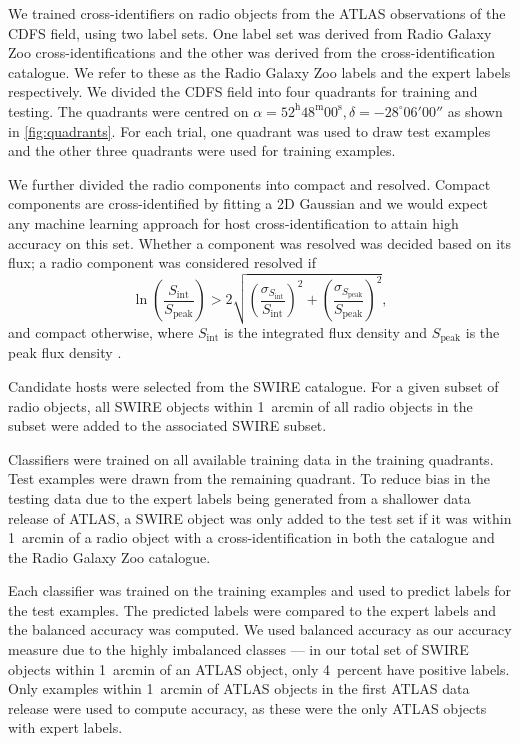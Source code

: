 \documentclass[fleqn,usenatbib,usedcolumn]{mnras}
\begin{document}
    We trained cross-identifiers on radio objects from the ATLAS observations of
    the CDFS field, using two label sets. One label set was derived from Radio
    Galaxy Zoo cross-identifications and the other was derived from the
    \citet{norris06} cross-identification catalogue. We refer to these as the
    Radio Galaxy Zoo labels and the expert labels respectively. We divided the
    CDFS field into four quadrants for training and testing. The quadrants were
    centred on $\alpha = 52^\text{h}48^\text{m}00^\text{s},
    \delta = -28^\circ{}06'00''$ as shown in \autoref{fig:quadrants}. For
    each trial, one quadrant was used to draw test examples and the other three
    quadrants were used for training examples.

    We further divided the radio components into compact and resolved. Compact
    components are cross-identified by fitting a 2D Gaussian \citep[as
    in][]{norris06} and we would expect any machine learning approach for host
    cross-identification to attain high accuracy on this set. Whether a
    component was resolved was decided based on its flux; a radio component was
    considered resolved if
    \begin{equation}
        \ln \left(
          \frac{S_{\text{int}}}
               {S_{\text{peak}}}
        \right) > 2\sqrt{\left(
          \frac{\sigma_{S_{\text{int}}}}
               {S_{\text{int}}}
        \right)^2 + \left(
          \frac{\sigma_{S_{\text{peak}}}}
               {S_{\text{peak}}}
        \right)^2},
    \end{equation}%
    and compact otherwise, where \(S_{\text{int}}\) is the integrated flux
    density and \(S_{\text{peak}}\) is the peak flux density
    \citep{franzen15}.

    Candidate hosts were selected from the SWIRE catalogue. For a given subset
    of radio objects, all SWIRE objects within 1~arcmin of all radio objects in
    the subset were added to the associated SWIRE subset.

    Classifiers were trained on all available training data in the training
    quadrants. Test examples were drawn from the remaining quadrant. To reduce
    bias in the testing data due to the expert labels being generated from a
    shallower data release of ATLAS, a SWIRE object was only added to the test
    set if it was within 1~arcmin of a radio object with a cross-identification
    in both the \citet{norris06} catalogue and the Radio Galaxy Zoo catalogue.

    Each classifier was trained on the training examples and used to predict
    labels for the test examples. The predicted labels were compared to the
    expert labels and the balanced accuracy was computed. We used balanced
    accuracy as our accuracy measure due to the highly imbalanced classes --- in
    our total set of SWIRE objects within 1~arcmin of an ATLAS object, only
    4~percent have positive labels. Only examples within 1~arcmin of ATLAS
    objects in the first ATLAS data release \citep{norris06} were used to
    compute accuracy, as these were the only ATLAS objects with expert labels.
\end{document}
